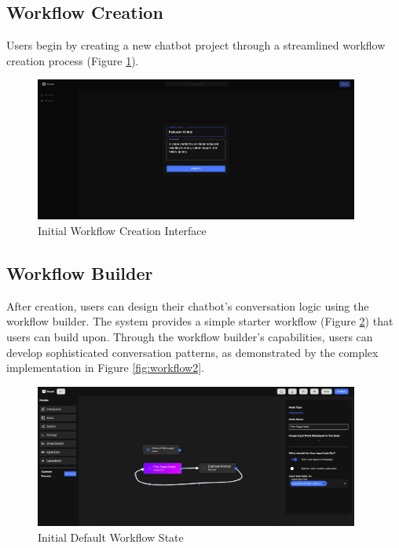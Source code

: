 \subsection{Workflow Creation}
Users begin by creating a new chatbot project through a streamlined workflow creation process (Figure \ref{fig:create-workflow}).

\begin{figure}[H]
    \centering
    \includegraphics[width=0.95\textwidth]{assets/screenshots/create-workflow.png}
    \caption{Initial Workflow Creation Interface}
    \label{fig:create-workflow}
\end{figure}

\subsection{Workflow Builder}
After creation, users can design their chatbot's conversation logic using the workflow builder. The system provides a simple starter workflow (Figure \ref{fig:workflow1}) that users can build upon. Through the workflow builder's capabilities, users can develop sophisticated conversation patterns, as demonstrated by the complex implementation in Figure \ref{fig:workflow2}.

\begin{figure}[H]
    \centering
    \includegraphics[width=0.95\textwidth]{assets/screenshots/workflow1.png}
    \caption{Initial Default Workflow State}
    \label{fig:workflow1}
\end{figure}

